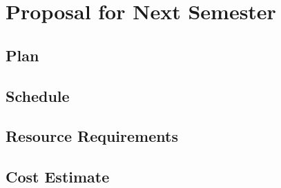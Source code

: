 \section{Proposal for Next Semester}

\subsection{Plan}

\subsection{Schedule}

\subsection{Resource Requirements}

\subsection{Cost Estimate}